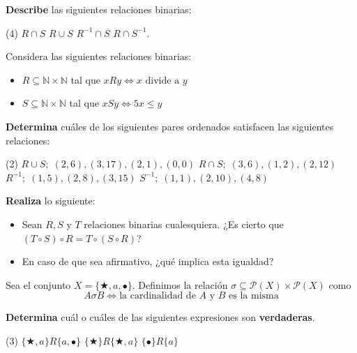 \documentclass[oneside]{style}
\begin{document}
\begin{questions}[label=\protect\circled{\bfseries\arabic*}]
{        \textbf{Describe} las siguientes relaciones binarias:
        \begin{tasks}(4)
            \task $R \cap S$
            \task $R \cup S$ 
            \task $R^{-1} \cap S$ 
            \task $R \cap S^{-1}$. 
        \end{tasks}
    }

    \question
    {
        Considera las siguientes relaciones binarias:
        \begin{itemize}
            \item $R \subseteq \mathbb{N} \times \mathbb{N}$ tal que 
            $x R y \Leftrightarrow x \text{ divide a } y$

            \item $S \subseteq \mathbb{N} \times \mathbb{N}$ tal que 
            $x S y \Leftrightarrow 5x \leq y$
        \end{itemize}

        \textbf{Determina} cuáles de los siguientes pares ordenados satisfacen las 
        siguientes relaciones:
        \begin{tasks}(2)
            \task $R \cup S; \; (2,6), (3,17), (2,1), (0,0)$
            \task $R \cap S; \; (3,6), (1,2), (2,12)$
            \task $R^{-1}; \; (1,5), (2,8), (3,15)$
            \task $S^{-1}; \; (1,1), (2,10), (4,8)$
        \end{tasks}
    }

    \question
    {
        \textbf{Realiza} lo siguiente: 
        \begin{itemize}
            \item Sean $R,S$ y $T$ relaciones binarias cualesquiera. ¿Es cierto que 
            $(T \circ S) \circ R = T \circ (S \circ R)$?

            \item En caso de que sea afirmativo, ¿qué implica esta igualdad?
        \end{itemize}
    }

    \question
    {
        Sea el conjunto $X = \{\bigstar, a, \bullet\}$. Definimos la relación 
        $\sigma \subseteq \mathcal{P}(X) \times \mathcal{P}(X)$ como 
        \begin{equation*}
            A \sigma B \Leftrightarrow \text{la cardinalidad de $A$ y $B$ es 
            la misma}
        \end{equation*} 
    }

    \textbf{Determina} cuál o cuáles de las siguientes expresiones son 
    \textbf{verdaderas}.
    \begin{tasks}(3)
        \task $\{\bigstar, a\} R \{a, \bullet\}$
        \task $\{\bigstar\} R \{\bigstar, a\}$
        \task $\{\bullet\} R \{a\}$
    \end{tasks}


\end{questions}
\end{document}
